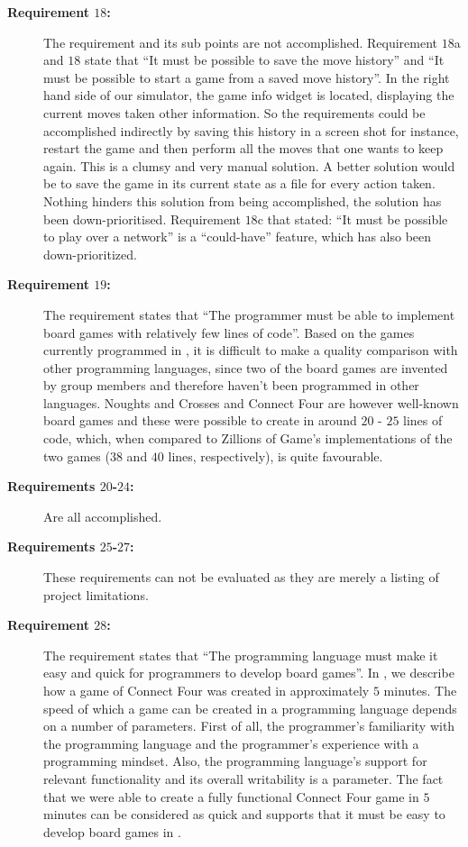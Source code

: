 \begin{description}
  \item[\textbf{Requirement $18$:}]
    The requirement and its sub points are not accomplished. Requirement
    $18$a and $18$ state that ``It must be possible to save the move
    history'' and ``It must be possible to start a game from a saved
    move history''. In the right hand side of our simulator, the game
    info widget is located, displaying the current moves taken other
    information. So the requirements could be accomplished indirectly by
    saving this history in a screen shot for instance, restart the game
    and then perform all the moves that one wants to keep again. This
    is a clumsy and very manual solution. A better solution would be to
    save the game in its current state as a file for every action taken.
    Nothing hinders this solution from being accomplished, the solution
    has been down-prioritised. Requirement $18$c that stated: ``It must
    be possible to play over a network'' is a ``could-have'' feature,
    which has also been down-prioritized.

  \item[\textbf{Requirement $19$:}]
    The requirement states that ``The programmer must be able to
    implement board games with relatively few lines of code''. Based on
    the games currently programmed in \productname{}, it is difficult to
    make a quality comparison with other programming languages, since
    two of the board games are invented by group members and therefore
    haven't been programmed in other languages. Noughts and Crosses
    and Connect Four are however well-known board games and these were
    possible to create in around $20$ - $25$ lines of code, which, when
    compared to Zillions of Game's implementations of the two games
    ($38$ and $40$ lines, respectively), is quite favourable.

  \item[\textbf{Requirements $20$-$24$:}]
    Are all accomplished.

  \item[\textbf{Requirements $25$-$27$:}]
    These requirements can not be evaluated as they are merely a listing
    of project limitations.

  \item[\textbf{Requirement $28$:}]
    The requirement states that ``The programming language must make
    it easy and quick for programmers to develop board games''. In
    , we describe how a game of Connect Four
    was created in approximately $5$ minutes. The speed of which a
    game can be created in a programming language depends on a number
    of parameters. First of all, the programmer's familiarity with
    the programming language and the programmer's experience with a
    programming mindset. Also, the programming language's support for
    relevant functionality and its overall writability is a parameter.
    The fact that we were able to create a fully functional Connect Four
    game in $5$ minutes can be considered as quick and supports that it
    must be easy to develop board games in \productname{}.


\end{description}
